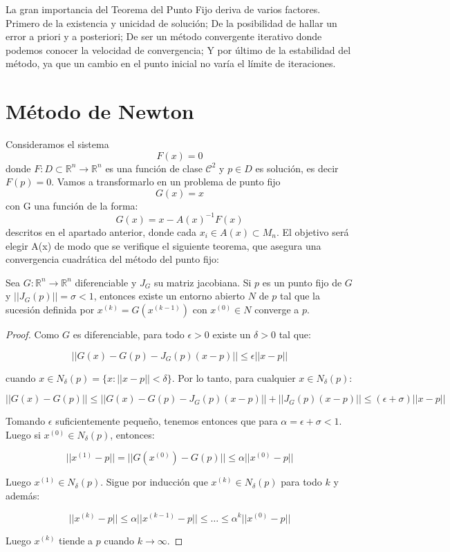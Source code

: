 La gran importancia del Teorema del Punto Fijo deriva de varios factores. Primero de la existencia y unicidad de solución; De la posibilidad de hallar un error a priori y a posteriori; De ser un método convergente iterativo donde podemos conocer la velocidad de convergencia; Y por último de la estabilidad del método, ya que un cambio en el punto inicial no varía el límite de iteraciones.

\section{Método de Newton}

Consideramos el sistema $$F(x)=0$$ donde $F: D \subset \mathbb{R}^{n} \longrightarrow \mathbb{R}^n$ es una función de clase $\mathcal{C}^{2}$ y $p \in D$ es solución, es decir $F(p) = 0$.
Vamos a transformarlo en un problema de punto fijo $$G(x) = x$$ con G una función de la forma:
\[G(x) = x - A(x)^{-1} F(x)\]
descritos en el apartado anterior, donde cada $x_{i} \in A(x) \subset M_{n}$. El objetivo será elegir A(x) de modo que se verifique el siguiente teorema, que asegura una convergencia cuadrática del método del punto fijo:\\

\begin{theorem}\label{TPF}
	Sea $G : \mathbb{R}^n \to \mathbb{R}^n$ diferenciable y $J_G$ su matriz jacobiana.
	Si $p$ es un punto fijo de $G$ y $||J_G(p)|| = \sigma < 1$, entonces existe un entorno abierto $N$ de $p$ tal que la sucesión definida por $x^{(k)}=G(x^{(k-1)})$ con $x^{(0)}\in N$ converge a $p$.
\end{theorem}
\begin{proof}
Como $G$ es diferenciable, para todo $\epsilon > 0$ existe un $\delta > 0$ tal que:

\[ ||G(x) - G(p) - J_G(p)(x-p) || \leq \epsilon ||x-p|| \]

cuando $x \in N_\delta(p)=\{x : ||x-p||<\delta\}$. Por lo tanto, para cualquier $x \in N_\delta(p)$:

\[ ||G(x)-G(p)|| \leq ||G(x) - G(p) - J_G(p)(x-p)|| + ||J_G(p)(x-p)|| \leq (\epsilon+\sigma) ||x-p|| \]

Tomando $\epsilon$ suficientemente pequeño, tenemos entonces que para $\alpha=\epsilon+\sigma<1$. Luego si $x^{(0)} \in N_\delta(p)$, entonces:

\[ ||x^{(1)}-p|| = ||G(x^{(0)})-G(p)|| \leq \alpha ||x^{(0)} - p|| \]

Luego $x^{(1)} \in N_\delta(p)$. Sigue por inducción que $x^{(k)} \in N_\delta(p)$ para todo $k$ y además:

\[ ||x^{(k)}-p|| \leq \alpha ||x^{(k-1)}-p|| \leq \dots \leq \alpha^k ||x^{(0)}-p|| \]

Luego $x^{(k)}$ tiende a $p$ cuando $k \to \infty$.
\end{proof}

